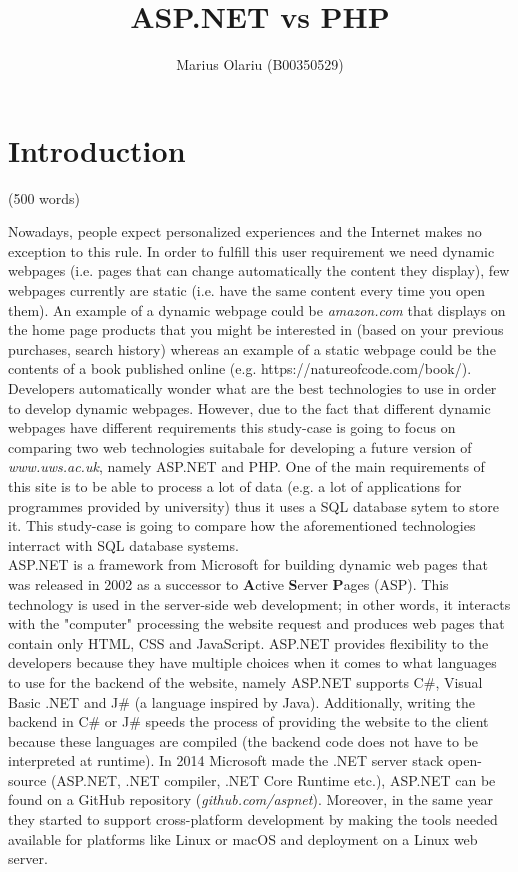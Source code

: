 \documentclass[11]{article}
\begin{document}
\title{ASP.NET vs PHP}
\author{Marius Olariu (B00350529)}
\date{}
\maketitle

\section*{Introduction}(500 words)\\


	Nowadays, people expect personalized experiences and the Internet makes no exception to this rule. In order to fulfill this user requirement we need dynamic webpages (i.e. pages that can change automatically the content they display), few webpages currently are static (i.e. have the same content every time you open them). An example of a dynamic webpage could be \textit{amazon.com} that displays on the home page products that you might be interested in (based on your previous purchases, search history) whereas an example of a static webpage could be the contents of a book published online (e.g. https://natureofcode.com/book/). Developers automatically wonder what are the best technologies to use in order to develop dynamic webpages. However, due to the fact that different dynamic webpages have different requirements this study-case is going to focus on comparing two web technologies suitabale for developing a future version of \textit{www.uws.ac.uk}, namely ASP.NET and PHP. One of the main requirements of this site is to be able to process a lot of data (e.g. a lot of applications for programmes provided by university) thus it uses a SQL database sytem to store it. This study-case is going to compare how the aforementioned technologies interract with SQL database systems. \\ 
	
	ASP.NET is a framework from Microsoft for building dynamic web pages that was released in 2002 as a successor to \textbf{A}ctive \textbf{S}erver \textbf{P}ages (ASP).  This technology is used in the server-side web development; in other words, it interacts with the "computer" processing the website request and produces web pages that contain only HTML, CSS and JavaScript. ASP.NET provides flexibility to the developers because they have multiple choices when it comes to what languages to use for the backend of the website, namely ASP.NET supports C\#, Visual Basic .NET and J\# (a language inspired by Java). Additionally, writing the backend in C\# or J\# speeds the process of providing the website to the client because these languages are compiled (the backend code does not have to be interpreted at runtime). In 2014 Microsoft made the .NET server stack open-source (ASP.NET, .NET compiler, .NET Core Runtime etc.), ASP.NET can be found on a GitHub repository (\textit{github.com/aspnet}). Moreover, in the same year they started to support cross-platform development by making the tools needed available for platforms like Linux or macOS and deployment on a Linux web server.\\
	
\end{document}
